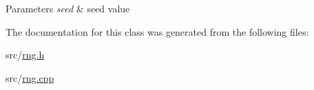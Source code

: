 \begin{DoxyParams}{Parameters}
{\em seed} & seed value \\
\hline
\end{DoxyParams}


The documentation for this class was generated from the following files\+:\begin{DoxyCompactItemize}
\item 
src/\hyperlink{rng_8h}{rng.\+h}\item 
src/\hyperlink{rng_8cpp}{rng.\+cpp}\end{DoxyCompactItemize}
